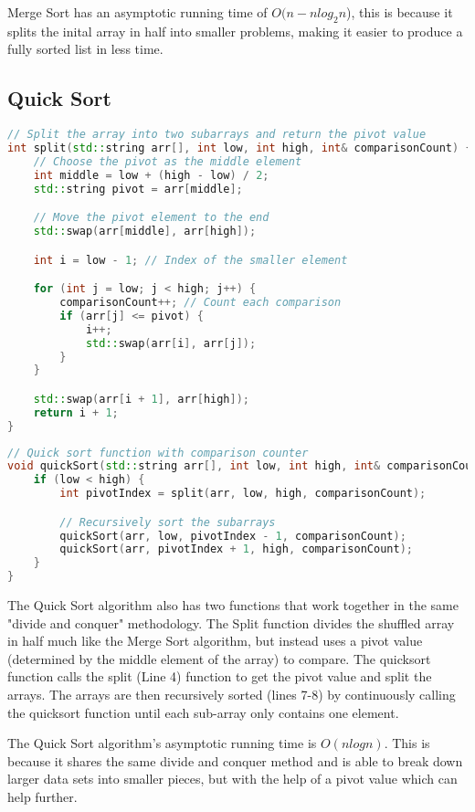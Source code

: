 \documentclass[letterpaper, 10pt,DIV=13]{scrartcl}
\numberwithin{equation}{section} %
\numberwithin{figure}{section} %
\numberwithin{table}{section} %
\begin{document}
Merge Sort has an asymptotic running time of $O(n - nlog_2n$), this is because it splits the inital array in half into smaller problems, making it easier to produce a fully sorted list in less time.
\pagebreak
\subsection{Quick Sort}
\begin{lstlisting}[language=c++, caption= Splitting the Arrays]
    // Split the array into two subarrays and return the pivot value
int split(std::string arr[], int low, int high, int& comparisonCount) {
    // Choose the pivot as the middle element
    int middle = low + (high - low) / 2;
    std::string pivot = arr[middle];

    // Move the pivot element to the end
    std::swap(arr[middle], arr[high]);

    int i = low - 1; // Index of the smaller element

    for (int j = low; j < high; j++) {
        comparisonCount++; // Count each comparison
        if (arr[j] <= pivot) {
            i++;
            std::swap(arr[i], arr[j]);
        }
    }

    std::swap(arr[i + 1], arr[high]);
    return i + 1;
}
\end{lstlisting}
\begin{lstlisting}[language=c++, caption= Quick Sort Algorithm]
    // Quick sort function with comparison counter
void quickSort(std::string arr[], int low, int high, int& comparisonCount) {
    if (low < high) {
        int pivotIndex = split(arr, low, high, comparisonCount);

        // Recursively sort the subarrays
        quickSort(arr, low, pivotIndex - 1, comparisonCount);
        quickSort(arr, pivotIndex + 1, high, comparisonCount);
    }
}
\end{lstlisting}
The Quick Sort algorithm also has two functions that work together in the same "divide and conquer" methodology. The Split function divides the shuffled array in half much like the Merge Sort algorithm, but instead uses a pivot value (determined by the middle element of the array) to compare. The quicksort function calls the split (Line 4) 
function to get the pivot value and split the arrays. The arrays are then recursively sorted (lines 7-8) by continuously calling the quicksort function until each sub-array only contains one element.

The Quick Sort algorithm's asymptotic running time is $O(nlogn)$. This is because it shares the same divide and conquer method and is able to break down larger data sets into smaller pieces, but with the help of a pivot value which can help further.
\end{document}
